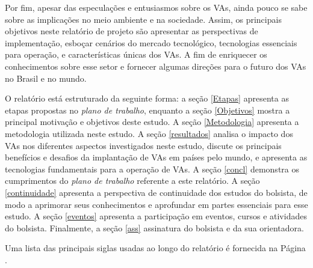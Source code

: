 \documentclass[
	12pt,				%
	openany, %
	a4paper,			%
	english,			%
	french,				%
	spanish,			%
	brazil				%
	]{abntex2}
\begin{document}
Por fim, apesar das especulações e entusiasmos sobre os VAs, ainda pouco se sabe sobre as implicações no meio ambiente e na sociedade. Assim, os principais objetivos neste relatório de projeto são apresentar as perspectivas de implementação, esboçar cenários do mercado tecnológico, tecnologias essenciais para operação, e características únicas dos VAs. A fim de enriquecer os conhecimentos sobre esse setor e fornecer algumas direções para o futuro dos VAs no Brasil e no mundo.

O relatório está estruturado da seguinte forma: a seção \ref{Etapas} apresenta as etapas propostas no \textit{plano de trabalho}, enquanto a seção \ref{Objetivos} mostra a principal motivação e objetivos deste estudo. A seção \ref{Metodologia} apresenta a metodologia utilizada neste estudo. A seção \ref{resultados} analisa o impacto dos VAs nos diferentes aspectos investigados neste estudo, discute os principais benefícios e desafios da implantação de VAs em países pelo mundo, e apresenta as tecnologias fundamentais para a operação de VAs. A seção \ref{concl} demonstra os cumprimentos do \textit{plano de trabalho} referente a este relatório. A seção \ref{continuidade} apresenta a perspectiva de continuidade dos estudos do bolsista, de modo a aprimorar seus conhecimentos e aprofundar em partes essenciais para esse estudo. A seção \ref{eventos} apresenta a participação em eventos, cursos e atividades do bolsista. Finalmente, a seção \ref{ass} assinatura do bolsista e da sua orientadora.


Uma lista das principais siglas usadas ao longo do relatório é fornecida na Página \pageref{eq:1}.





%




\end{document}
